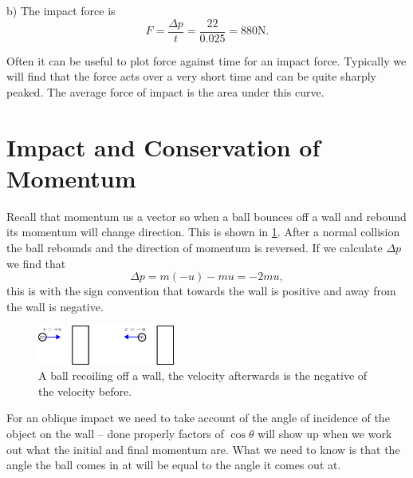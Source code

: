 \documentclass[a4paper,12pt]{book}
\begin{document}
b) The impact force is
\begin{equation*}
F=\frac{\Delta p}{t}=\frac{22}{0.025}=880\text{N}.
\end{equation*}


Often it can be useful to plot force against time for an impact force. Typically we will find that the force acts over a very short time and can be quite sharply peaked. The average force of impact is the area under this curve.\\

\vspace{2cm}

\section{Impact and Conservation of Momentum}
Recall that momentum us a vector so when a ball bounces off a wall and rebound its momentum will change direction.  This is shown in \cref{fig: recoiling ball}. After a normal collision the ball rebounds and the direction of momentum is reversed. If we calculate $\Delta p$ we find that
\begin{equation*}
\Delta p=m(-u)-mu=-2mu,
\end{equation*}
this is with the sign convention that towards the wall is positive and away from the wall is negative.

\begin{figure}[ht]
    \centering
    \includegraphics[width=0.4\textwidth]{figures/recoil.png}
    \caption{A ball recoiling off a wall, the velocity afterwards is the negative of the velocity before.}
    \label{fig: recoiling ball}
\end{figure}

For an oblique impact we need to take account of the angle of incidence of the object on the wall -- done properly factors of $\cos\theta$ will show up when we work out what the initial and final momentum are. What we need to know is that the angle the ball comes in at will be equal to the angle it comes out at.
\end{document}
